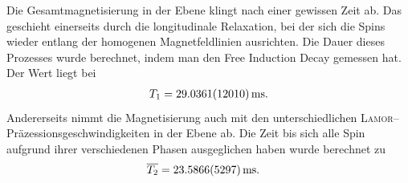\documentclass[10pt]{article}
\begin{document}
\begin{multicols}{2}
Die Gesamtmagnetisierung in der Ebene klingt nach einer gewissen Zeit ab.
Das geschieht einerseits durch die longitudinale Relaxation, bei der sich die Spins wieder entlang der homogenen Magnetfeldlinien ausrichten.
Die Dauer dieses Prozesses wurde berechnet, indem man den Free Induction Decay gemessen hat.
Der Wert liegt bei
\begin{align} 
        T_1=\SI{29.0361+-1.201}{ms}
.\end{align} 
Andererseits nimmt die Magnetisierung auch mit den unterschiedlichen \textsc{Lamor}--Präzessionsgeschwindigkeiten in der Ebene ab.
Die Zeit bis sich alle Spin aufgrund ihrer verschiedenen Phasen ausgeglichen haben wurde berechnet zu
\begin{align} 
        \overline{T_2}&=\SI{23.5866+-0.5297}{ms}
.\end{align} 


\end{multicols}
\printbibliography
\end{document}
